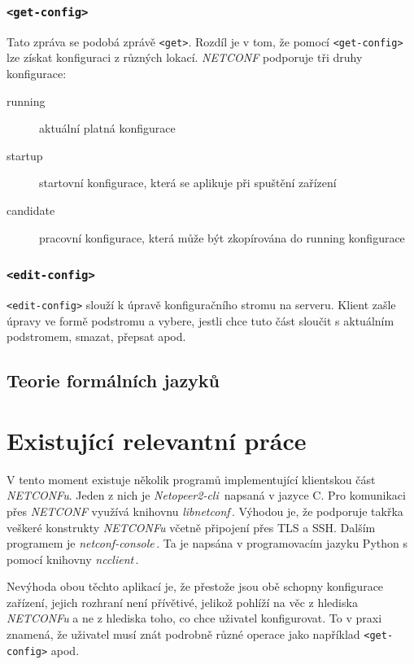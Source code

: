 \documentclass[thesis=B,czech,hidelinks]{FITthesis}[2019/03/06]
\begin{document}
\subsection{\texttt{<get-config>}}
Tato zpráva se podobá zprávě \texttt{<get>}. Rozdíl je v tom, že pomocí \texttt{<get-config>} lze získat konfiguraci z různých lokací. \textit{NETCONF} podporuje tři druhy konfigurace:
\begin{description}
    \item[running]{aktuální platná konfigurace}
    \item[startup]{startovní konfigurace, která se aplikuje při spuštění zařízení}
    \item[candidate]{pracovní konfigurace, která může být zkopírována do running konfigurace}
\end{description}

\subsection{\texttt{<edit-config>}}
\texttt{<edit-config>} slouží k úpravě konfiguračního stromu na serveru. Klient zašle úpravy ve formě podstromu a vybere, jestli chce tuto část sloučit s aktuálním podstromem, smazat, přepsat apod.

\section{Teorie formálních jazyků}


\chapter{Existující relevantní práce}
V tento moment existuje několik programů implementující klientskou část \textit{NETCONFu}. Jeden z nich je \textit{Netopeer2-cli}\,\cite{netopeer} napsaná v jazyce C. Pro komunikaci přes \textit{NETCONF} využívá knihovnu \textit{libnetconf}\,\cite{libnetconf}. Výhodou je, že podporuje takřka veškeré konstrukty \textit{NETCONFu} včetně připojení přes TLS a SSH\@. Dalším programem je \textit{netconf-console}\,\cite{netconf-console}. Ta je napsána v programovacím jazyku Python s pomocí knihovny \textit{ncclient}\,\cite{ncclient}.

Nevýhoda obou těchto aplikací je, že přestože jsou obě schopny konfigurace zařízení, jejich rozhraní není přívětivé, jelikož pohlíží na věc z hlediska \textit{NETCONFu} a ne z hlediska toho, co chce uživatel konfigurovat. To v praxi znamená, že uživatel musí znát podrobně různé operace jako například \texttt{<get-config>} apod.
\end{document}
